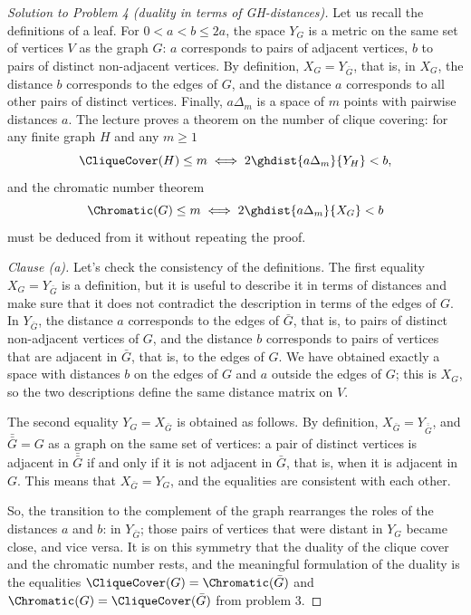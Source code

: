 \documentclass[a4paper,12pt]{report}
\begin{document}
\begin{proof}[Solution to Problem \textup{4} \textup{(}duality in terms of GH-distances\textup{)}]
Let us recall the definitions of a leaf. For $0<a<b\le2a$, the space $Y_G$ is a metric on the same set of vertices $V$ as the graph $G$\textup{:} $a$ corresponds to pairs of adjacent vertices, $b$ to pairs of distinct non-adjacent vertices. By definition, $X_G=Y_{\bar G}$, that is, in $X_G$, the distance $b$ corresponds to the edges of $G$, and the distance $a$ corresponds to all other pairs of distinct vertices. Finally, $a\Delta_m$ is a space of $m$ points with pairwise distances $a$. The lecture proves a theorem on the number of clique covering\textup{:} for any finite graph $H$ and any $m\ge1$
\[
\CliqueCover(H)\le m\iff 2\ghdist{a\Delta_m}{Y_H}<b,
\]
and the chromatic number theorem
\[
\Chromatic(G)\le m\iff 2\ghdist{a\Delta_m}{X_G}<b
\]
must be deduced from it without repeating the proof.

\textit{Clause \textup{(a)}.} Let's check the consistency of the definitions. The first equality $X_G=Y_{\bar G}$ is a definition, but it is useful to describe it in terms of distances and make sure that it does not contradict the description in terms of the edges of $G$. In $Y_{\bar G}$, the distance $a$ corresponds to the edges of $\bar G$, that is, to pairs of distinct non-adjacent vertices of $G$, and the distance $b$ corresponds to pairs of vertices that are adjacent in $\bar G$, that is, to the edges of $G$. We have obtained exactly a space with distances $b$ on the edges of $G$ and $a$ outside the edges of $G$; this is $X_G$, so the two descriptions define the same distance matrix on $V$.

The second equality $Y_G=X_{\bar G}$ is obtained as follows. By definition, $X_{\bar G}=Y_{\bar{\bar G}}$, and $\bar{\bar G}=G$ as a graph on the same set of vertices\textup{:} a pair of distinct vertices is adjacent in $\bar{\bar G}$ if and only if it is not adjacent in $\bar G$, that is, when it is adjacent in $G$. This means that $X_{\bar G}=Y_G$, and the equalities are consistent with each other.

So, the transition to the complement of the graph rearranges the roles of the distances $a$ and $b$\textup{:} in $Y_{\bar G}$; those pairs of vertices that were distant in $Y_G$ became close, and vice versa. It is on this symmetry that the duality of the clique cover and the chromatic number rests, and the meaningful formulation of the duality is the equalities $\CliqueCover(G)=\Chromatic(\bar G)$ and $\Chromatic(G)=\CliqueCover(\bar G)$ from problem \textup{3}.


\end{proof}
\end{document}
